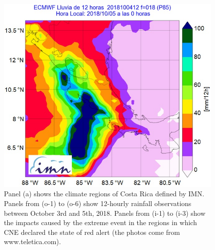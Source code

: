 \documentclass[twocol]{ametsocV5} %
\begin{document}
\begin{figure}
\centerline{\includegraphics[width=39pc]{manuscript/Figures/Fig5.jpg}}
\caption{Panel (a) shows the climate regions of Costa Rica defined by IMN. Panels from (o-1) to (o-6) show 12-hourly rainfall observations between October 3rd and 5th, 2018. Panels from (i-1) to (i-3) show the impacts caused by the extreme event in the regions in which CNE declared the state of red alert (the photos come from www.teletica.com).}
\label{Fig5}
\end{figure}
\end{document}
